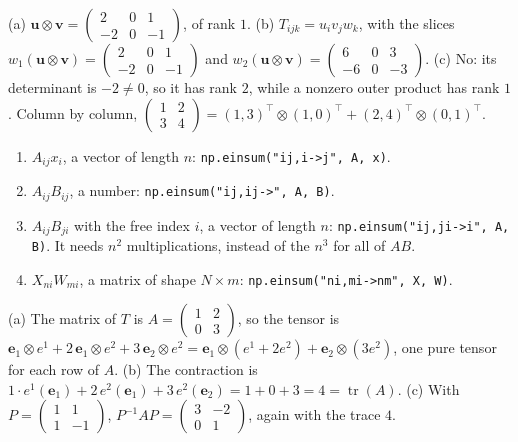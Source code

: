 \documentclass[11pt]{article}
\DeclareMathOperator{\tr}{tr}
\begin{document}
\begin{description}[leftmargin=0pt, itemsep=0.3em]
    \item[\ref{pr:outer-practice}.] (a) $\mathbf{u} \otimes \mathbf{v} = \left(\begin{smallmatrix} 2 & 0 & 1 \\ -2 & 0 & -1 \end{smallmatrix}\right)$, of rank $1$. (b) $T_{ijk} = u_iv_jw_k$, with the slices $w_1(\mathbf{u} \otimes \mathbf{v}) = \left(\begin{smallmatrix} 2 & 0 & 1 \\ -2 & 0 & -1 \end{smallmatrix}\right)$ and $w_2(\mathbf{u} \otimes \mathbf{v}) = \left(\begin{smallmatrix} 6 & 0 & 3 \\ -6 & 0 & -3 \end{smallmatrix}\right)$. (c) No: its determinant is $-2 \neq 0$, so it has rank $2$, while a nonzero outer product has rank $1$. Column by column, $\left(\begin{smallmatrix} 1 & 2 \\ 3 & 4 \end{smallmatrix}\right) = (1, 3)^\top \otimes (1, 0)^\top + (2, 4)^\top \otimes (0, 1)^\top$.
    \item[\ref{pr:einsum-practice}.]
    \begin{enumerate}[label=(\alph*), nosep]
        \item $A_{ij}x_i$, a vector of length $n$: \texttt{np.einsum("ij,i->j", A, x)}.
        \item $A_{ij}B_{ij}$, a number: \texttt{np.einsum("ij,ij->", A, B)}.
        \item $A_{ij}B_{ji}$ with the free index $i$, a vector of length $n$: \texttt{np.einsum("ij,ji->i", A, B)}. It needs $n^2$ multiplications, instead of the $n^3$ for all of $AB$.
        \item $X_{ni}W_{mi}$, a matrix of shape $N \times m$: \texttt{np.einsum("ni,mi->nm", X, W)}.
    \end{enumerate}
    \item[\ref{pr:linear-map-tensor}.] (a) The matrix of $T$ is $A = \left(\begin{smallmatrix} 1 & 2 \\ 0 & 3 \end{smallmatrix}\right)$, so the tensor is $\mathbf{e}_1 \otimes e^1 + 2\, \mathbf{e}_1 \otimes e^2 + 3\, \mathbf{e}_2 \otimes e^2 = \mathbf{e}_1 \otimes (e^1 + 2e^2) + \mathbf{e}_2 \otimes (3e^2)$, one pure tensor for each row of $A$. (b) The contraction is $1 \cdot e^1(\mathbf{e}_1) + 2\, e^2(\mathbf{e}_1) + 3\, e^2(\mathbf{e}_2) = 1 + 0 + 3 = 4 = \tr(A)$. (c) With $P = \left(\begin{smallmatrix} 1 & 1 \\ 1 & -1 \end{smallmatrix}\right)$, $P^{-1}AP = \left(\begin{smallmatrix} 3 & -2 \\ 0 & 1 \end{smallmatrix}\right)$, again with the trace $4$.

\end{description}
\end{document}
